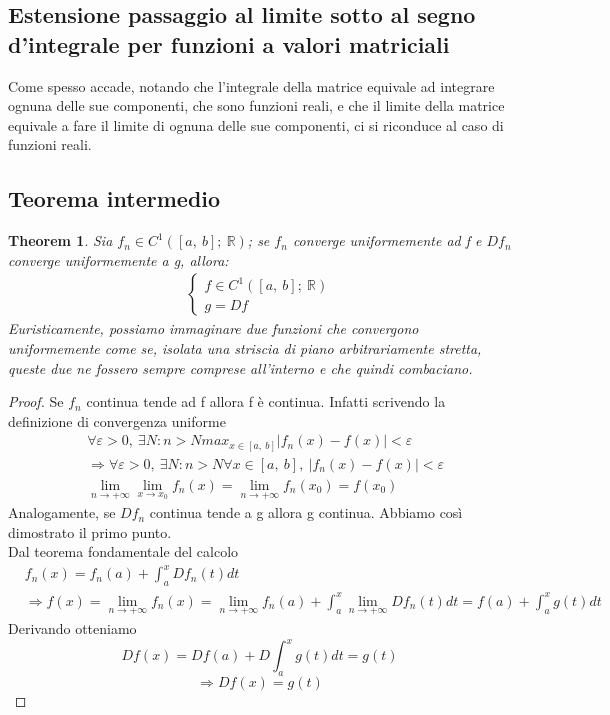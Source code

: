 \documentclass[10pt,a4paper]{article}
\newtheorem{theorem}{Theorem}
\newtheorem{proof}{Proof}
\begin{document}
\subsection{Estensione passaggio al limite sotto al segno d'integrale per funzioni a valori matriciali}
Come spesso accade, notando che l'integrale della matrice equivale ad integrare ognuna delle sue componenti, che sono funzioni reali, e che il limite della matrice equivale a fare il limite di ognuna delle sue componenti, ci si riconduce al caso di funzioni reali. 
\subsection{Teorema intermedio}\label{sec:teorema_intermedio}
\begin{theorem}
Sia \(f_n \in C^1([a,\ b];\ \mathbb{R})\); se \(f_n\) converge uniformemente ad f e \(Df_n\) converge uniformemente a g, allora:
\begin{align*}
	\begin{cases}
		f\in C^1([a,\ b];\ \mathbb{R})\\
		g = Df
	\end{cases}
\end{align*}
Euristicamente, possiamo immaginare due funzioni che convergono uniformemente come se, isolata una striscia di piano arbitrariamente stretta, queste due ne fossero sempre comprese all'interno e che quindi combaciano.
\end{theorem}
\begin{proof}
	Se \(f_n\) continua tende ad f allora f è continua. Infatti scrivendo la definizione di convergenza uniforme 
	\begin{align*}
		&\forall \varepsilon>0,\ \exists N : n> N max_{x\in[a,\ b]} |f_n(x)-f(x)|<\varepsilon\\
		&\Rightarrow \forall \varepsilon>0,\ \exists N : n> N \forall x\in [a,\ b],\ |f_n(x)-f(x)|<\varepsilon\\
		&\lim_{n\to +\infty}\lim_{x\to x_0}f_n(x) = \lim_{n\to +\infty}f_n(x_0) = f(x_0) 
	\end{align*}
	Analogamente, se \(Df_n\) continua tende a g allora g continua. Abbiamo così dimostrato il primo punto.\\
	Dal teorema fondamentale del calcolo 
	\begin{align*}
		&f_n(x) = f_n(a)+\int_{a}^{x}Df_n(t)dt\\
		&\Rightarrow f(x) = \lim_{n\to+\infty}f_n(x) = \lim_{n\to+\infty}f_n(a)+\int_{a}^{x}\lim_{n\to+\infty}Df_n(t)dt=f(a)+\int_{a}^{x}g(t)dt
	\end{align*}
	Derivando otteniamo
	\[Df(x) = Df(a)+D\int_{a}^{x}g(t)dt=g(t)\]
	\[\Rightarrow Df(x) = g(t)\]
\end{proof}
\end{document}
